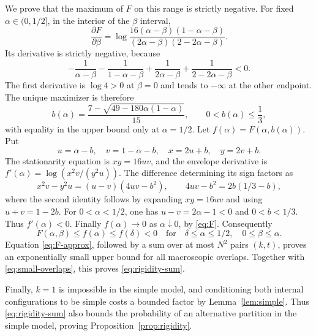 \documentclass[11pt]{article}
\theoremstyle{remark}
\newcommand{\1}{\mathbf 1}
\begin{document}
We prove that the maximum of $F$ on this range is strictly negative.
For fixed $\alpha\in(0,1/2]$, in the interior of the $\beta$ interval,
\[
 \frac{\partial F}{\partial\beta}
 =\log\frac{16(\alpha-\beta)(1-\alpha-\beta)}
                {(2\alpha-\beta)(2-2\alpha-\beta)}.
\]
Its derivative is strictly negative, because
\[
 -\frac1{\alpha-\beta}-\frac1{1-\alpha-\beta}
 +\frac1{2\alpha-\beta}+\frac1{2-2\alpha-\beta}<0.
\]
The first derivative is $\log4>0$ at $\beta=0$ and tends to
$-\infty$ at the other endpoint. The unique maximizer is therefore
\[
 b(\alpha)=\frac{7-\sqrt{49-180\alpha(1-\alpha)}}{15},
 \qquad 0<b(\alpha)\leq\frac13,
\]
with equality in the upper bound only at $\alpha=1/2$.
Let $f(\alpha)=F(\alpha,b(\alpha))$. Put
\[
 u=\alpha-b,\quad v=1-\alpha-b,\quad
 x=2u+b,\quad y=2v+b.
\]
The stationarity equation is $xy=16uv$, and the envelope derivative is
$f'(\alpha)=\log(x^2v/(y^2u))$.
The difference determining its sign factors as
\[
 x^2v-y^2u=(u-v)(4uv-b^2),\qquad
 4uv-b^2=2b(1/3-b),
\]
where the second identity follows by expanding $xy=16uv$ and using
$u+v=1-2b$. For $0<\alpha<1/2$, one has $u-v=2\alpha-1<0$ and
$0<b<1/3$. Thus $f'(\alpha)<0$. Finally $f(\alpha)\to0$ as
$\alpha\downarrow0$, by \eqref{eq:F}. Consequently
\[
 F(\alpha,\beta)\leq f(\alpha)\leq f(\delta)<0
 \quad\text{for}\quad
 \delta\leq\alpha\leq1/2,\quad0\leq\beta\leq\alpha.
\]
Equation \eqref{eq:F-approx}, followed by a sum over at most $N^2$
pairs $(k,t)$, proves an exponentially small upper bound for all
macroscopic overlaps. Together with \eqref{eq:small-overlaps}, this
proves \eqref{eq:rigidity-sum}.

Finally, $k=1$ is impossible in the simple model, and conditioning both
internal configurations to be simple costs a bounded factor by
Lemma~\ref{lem:simple}. Thus \eqref{eq:rigidity-sum} also bounds the
probability of an alternative partition in the simple model, proving
Proposition~\ref{prop:rigidity}.
\end{document}
